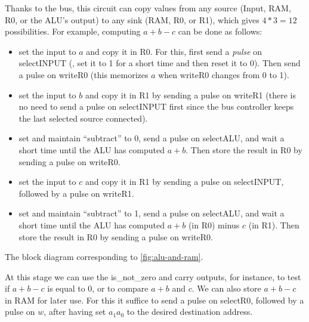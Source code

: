 Thanks to the bus, this circuit can copy values from any source (Input, RAM,
R0, or the ALU's output) to any sink (RAM, R0, or R1), which gives $4*3=12$
possibilities. For example, computing $a+b-c$ can be done as follows:
\begin{itemize}
  \item set the input to $a$ and copy it in R0. For this, first send a {\em
  pulse} on selectINPUT (\ie, set it to 1 for a short time and then reset it to
  0). Then send a pulse on writeR0 (this memorizes $a$ when writeR0 changes
  from 0 to 1).

  \item set the input to $b$ and copy it in R1 by sending a pulse on writeR1
  (there is no need to send a pulse on selectINPUT first since the bus
  controller keeps the last selected source connected).

  \item set and maintain ``subtract'' to 0, send a pulse on selectALU, and wait
  a short time until the ALU has computed $a+b$. Then store the result in R0 by
  sending a pulse on writeR0.

  \item set the input to $c$ and copy it in R1 by sending a pulse on
  selectINPUT, followed by a pulse on writeR1.

  \item set and maintain ``subtract'' to 1, send a pulse on selectALU, and wait
  a short time until the ALU has computed $a+b$ (in R0) minus $c$ (in R1). Then
  store the result in R0 by sending a pulse on writeR0.
\end{itemize}

\begin{Figure}
  

  \caption{The block diagram corresponding to
  \cref{fig:alu-and-ram}.}\label{fig:alu-and-ram-schema}
\end{Figure}

At this stage we can use the is\_not\_zero and carry outputs, for instance, to
test if $a+b-c$ is equal to 0, or to compare $a+b$ and $c$. We can also store
$a+b-c$ in RAM for later use. For this it suffice to send a pulse on selectR0,
followed by a pulse on $w$, after having set $a_1a_0$ to the desired
destination address.
